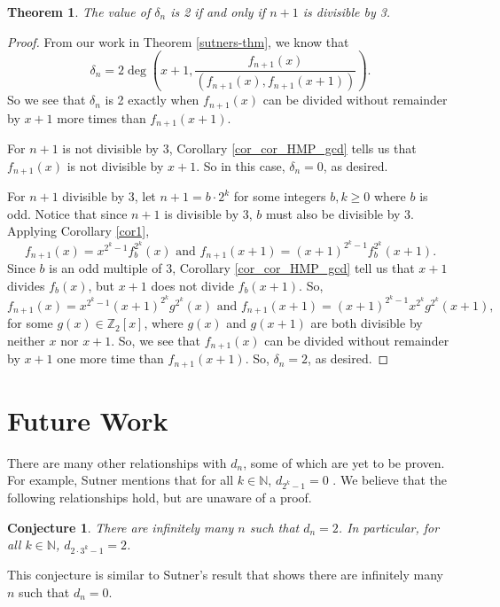 \documentclass[a4paper]{article}
\newtheorem{theorem}{Theorem}[section]
\newtheorem{conjecture}{Conjecture}[section]
\newcommand{\Z}{\mathbb{Z}}
\newcommand{\N}{\mathbb{N}}
\begin{document}
	\begin{theorem}\label{when-is-deltan-2}
		The value of $\delta_n$ is 2 if and only if $n+1$ is divisible by 3.
	\end{theorem}
	\begin{proof}
		From our work in Theorem \ref{sutners-thm}, we know that
		\begin{equation*}
			\delta_n = 2\deg\left(x+1,\frac{f_{n+1}(x)}{(f_{n+1}(x),f_{n+1}(x+1))}\right).
		\end{equation*}
		So we see that $\delta_n$ is 2 exactly when $f_{n+1}(x)$ can be divided without remainder by $x+1$ more times than $f_{n+1}(x+1)$.
		
		For $n+1$ is not divisible by 3, Corollary \ref{cor_cor_HMP_gcd} tells us that $f_{n+1}(x)$ is not divisible by $x+1$.
		So in this case, $\delta_n = 0$, as desired.
		
		For $n+1$ divisible by 3, let $n+1 = b \cdot 2^k$ for some integers $b, k \geq 0$ where $b$ is odd.
		Notice that since $n+1$ is divisible by 3, $b$ must also be divisible by 3.
		Applying Corollary \ref{cor1},
		\begin{equation*}
			f_{n+1}(x) = x^{2^k - 1}f_{b}^{2^k}(x) \text{ and } f_{n+1}(x+1) = (x+1)^{2^k - 1}f_{b}^{2^k}(x+1).
		\end{equation*}
		Since $b$ is an odd multiple of 3, Corollary \ref{cor_cor_HMP_gcd} tell us that $x+1$ divides $f_b(x)$, but $x+1$ does not divide $f_b(x+1)$.
		So,
		\begin{equation*}
			f_{n+1}(x) = x^{2^k - 1}(x+1)^{2^k}g^{2^k}(x) \text{ and } f_{n+1}(x+1) = (x+1)^{2^k - 1}x^{2^k}g^{2^k}(x+1),
		\end{equation*} 
		for some $g(x) \in \Z_2[x]$, where $g(x)$ and $g(x+1)$ are both divisible by neither $x$ nor $x+1$.
		So, we see that $f_{n+1}(x)$ can be divided without remainder by $x+1$ one more time than $f_{n+1}(x+1)$.
		So, $\delta_n = 2$, as desired.
	\end{proof}

	\section{Future Work}
	There are many other relationships with $d_n$, some of which are yet to be proven.
	For example, Sutner mentions that for all $k \in \N$, $d_{2^k - 1} = 0$ \cite{Sutner1989}.
	We believe that the following relationships hold, but are unaware of a proof.
	
	\begin{conjecture}\label{conj-all-2}
		There are infinitely many $n$ such that $d_n = 2$.
		In particular, for all $k \in \N$, $d_{2\cdot 3^{k} - 1} = 2$.
	\end{conjecture}
	This conjecture is similar to Sutner's result that shows there are infinitely many $n$ such that $d_n = 0$.
	
\end{document}

